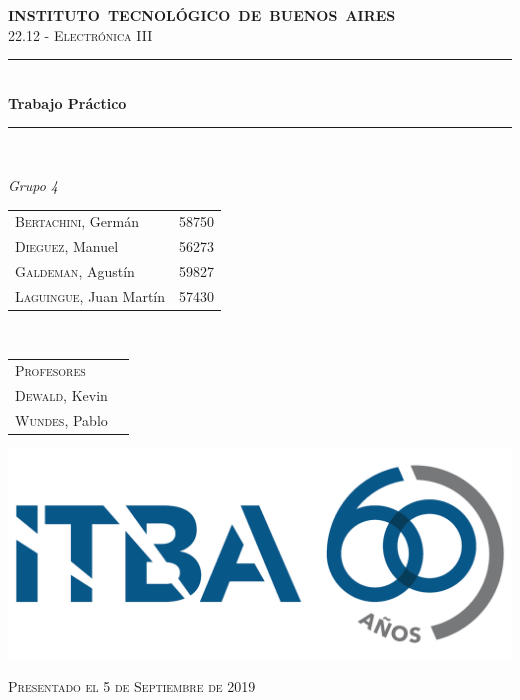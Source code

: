 
\begin{titlepage}
    \newcommand{\HRule}{\rule{\linewidth}{0.5mm}}
    \begin{center}
    \mbox{\textsc{\large \bfseries {INSTITUTO TECNOL\'OGICO DE BUENOS AIRES}}}\\[1cm]
    \textsc{\Large 22.12 - Electr\'onica III}\\[0.5cm]
    
    \HRule \\[0.6cm]
    { \Huge \bfseries Trabajo Pr\'actico }\\[0.4cm] 
    \HRule \\[1.5cm]
    
    
    \large
    
    \emph{\Large Grupo 4}\\
    \vspace{10px}
    
    \begin{tabular}{lr}
    \textsc{Bertachini}, Germ\'an  & 58750 \\ 	
    \textsc{Dieguez}, Manuel  & 56273 \\
    \textsc{Galdeman}, Agust\'in  & 59827 \\
    \textsc{Laguingue}, Juan Mart\'in  & 57430 \\
    \end{tabular} \\
    \vspace{20px}
    \begin{tabular}{lr}
    \textsc{Profesores}\\
    \textsc{Dewald}, Kevin\\
    \textsc{Wundes}, Pablo\\
    \end{tabular}
    \vspace{60px}


    \includegraphics[scale=0.20]{ITBA.png}    

    
    
    \vspace{30px}
    
    \textsc{\large Presentado el 5 de Septiembre de 2019}\\
    
    \end{center}
    
    \end{titlepage}
